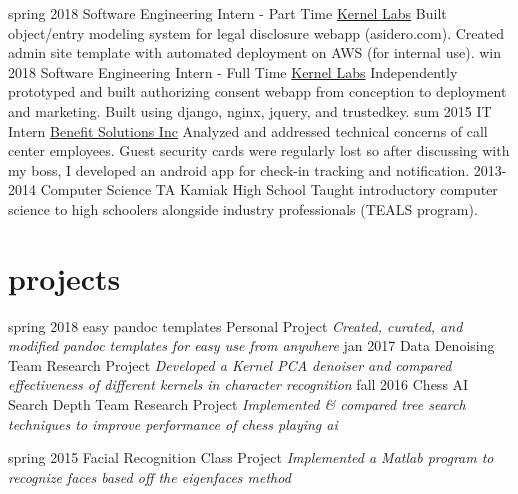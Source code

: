 \documentclass[]{friggeri-cv}
\begin{document}
\begin{entrylist}
  \entry
    {spring 2018}
    {Software Engineering Intern - Part Time}
    {\href{http://www.kernellabs.io/}{Kernel Labs}}
    {Built object/entry modeling system for legal disclosure webapp (asidero.com). Created admin site template with automated deployment on AWS (for internal use).}
  \entry
    {win 2018}
    {Software Engineering Intern - Full Time}
    {\href{http://www.kernellabs.io/}{Kernel Labs}}
    {Independently prototyped and built authorizing consent webapp from conception to deployment and marketing. Built using django, nginx, jquery, and trustedkey.}
  \entry
    {sum 2015}
    {IT Intern}
    {\href{http://www.bsitpa.com/}{Benefit Solutions Inc}}
    {Analyzed and addressed technical concerns of call center employees. Guest security cards were regularly lost so after discussing with my boss, I developed an android app for check-in tracking and notification.}
  \entry
    {2013-2014}
    {Computer Science TA}
    {Kamiak High School}
    {Taught introductory computer science to high schoolers alongside industry professionals (TEALS program).}
\end{entrylist}

\section{projects}

\begin{entrylist}
  \entry
    {spring 2018}
    {easy pandoc templates}
    {Personal Project}
    {\emph{Created, curated, and modified pandoc templates for easy use from anywhere}}
   \entry
    {jan 2017}
    {Data Denoising}
    {Team Research Project}
    {\emph{Developed a Kernel PCA denoiser and compared effectiveness of different kernels in character recognition}}
  \entry
    {fall 2016}
    {Chess AI Search Depth}
    {Team Research Project}
    {\emph{Implemented \& compared tree search techniques to improve performance of chess playing ai}}

  \entry
    {spring 2015}
    {Facial Recognition}
    {Class Project}
    {\emph{Implemented a Matlab program to recognize faces based off the eigenfaces method}}
\end{entrylist}


\end{document}
